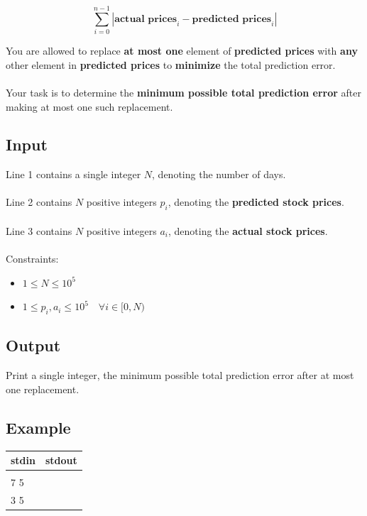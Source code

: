 \documentclass[12pt,a4paper]{article}
\begin{document}
\[
\sum_{i=0}^{n-1} \left| \textbf{actual prices}_i - \textbf{predicted prices}_i \right|
\]

\noindent You are allowed to replace \textbf{at most one} element of \textbf{predicted prices} with \textbf{any} other element in \textbf{predicted prices} to \textbf{minimize} the total prediction error. 
\\\\
\noindent
Your task is to determine the \textbf{minimum possible total prediction error} after making at most one such replacement.

\subsection*{\fontsize{16}{12}Input}
Line 1 contains a single integer $N$, denoting the number of days. \\\\
Line 2 contains $N$ positive integers $p_i$, denoting the \textbf{predicted stock prices}. \\\\
Line 3 contains $N$ positive integers $a_i$, denoting the \textbf{actual stock prices}.
\\\\
\noindent Constraints:
\begin{itemize}
    \item \( 1 \leq N \leq 10^5 \)
    \item \( 1 \leq p_i, a_i \leq 10^5\quad\forall i \in [0, N)\)
\end{itemize}

\subsection*{\fontsize{16}{12}Output}
Print a single integer, the minimum possible total prediction error after at most one replacement.

\subsection*{\fontsize{16}{12}Example}
\begin{table}[h]
  \centering
  \begin{tabularx}{\textwidth}{|>{\ttfamily}X|>{\ttfamily}X|}
  \hline
  stdin & stdout \\
  \hline
    3 & 3 \\
    1 7 5 & \\
    2 3 5 & \\  
  \hline
  \end{tabularx}
\end{table}
\end{document}
